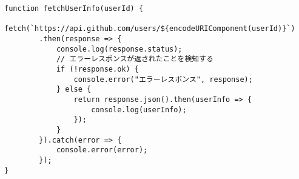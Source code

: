 \begin{lstlisting}
function fetchUserInfo(userId) {
    fetch(`https://api.github.com/users/${encodeURIComponent(userId)}`)
        .then(response => {
            console.log(response.status);
            // エラーレスポンスが返されたことを検知する
            if (!response.ok) {
                console.error("エラーレスポンス", response);
            } else {
                return response.json().then(userInfo => {
                    console.log(userInfo);
                });
            }
        }).catch(error => {
            console.error(error);
        });
}
\end{lstlisting}

